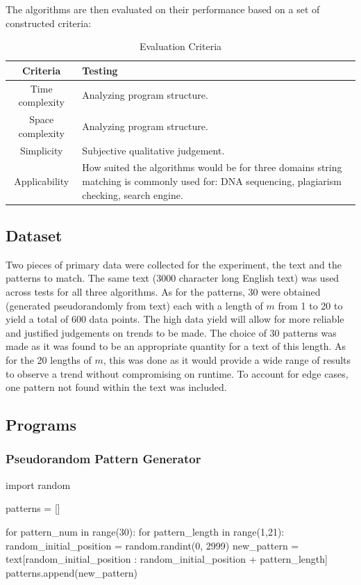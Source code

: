 \documentclass[12pt]{article}
\begin{document}
The algorithms are then evaluated on their performance based on a set of constructed criteria:

\begin{table}[!htbp]
    \centering
    \begin{tabular}{|c|p{12cm}|}
        \hline
        \textbf{Criteria} & \textbf{Testing} \\
        \hline
        Time complexity & Analyzing program structure. \\[0.25cm]
        Space complexity & Analyzing program structure. \\[0.25cm]
        Simplicity & Subjective qualitative judgement. \\[0.25cm]
        Applicability & How suited the algorithms would be for three domains string matching is commonly used for: DNA sequencing, plagiarism checking, search engine. \\
        \hline
    \end{tabular}
    \caption{Evaluation Criteria}
\end{table}
\pagebreak
\subsection{Dataset}
Two pieces of primary data were collected for the experiment, the text and the patterns to match. The same text (3000 character long English text) was used across tests for all three algorithms. As for the patterns, 30 were obtained (generated pseudorandomly from text) each with a length of $m$ from 1 to 20 to yield a total of 600 data points. The high data yield will allow for more reliable and justified judgements on trends to be made. The choice of 30 patterns was made as it was found to be an appropriate quantity for a text of this length. As for the 20 lengths of $m$, this was done as it would provide a wide range of results to observe a trend without compromising on runtime. To account for edge cases, one pattern not found within the text was included.

\subsection{Programs}
\subsubsection{Pseudorandom Pattern Generator}

\begin{singlespace}
\begin{python}
import random

patterns = []

for pattern_num in range(30):
	for pattern_length in range(1,21):
		random_initial_position = random.randint(0, 2999)
		new_pattern = text[random_initial_position : random_initial_position + pattern_length]
		patterns.append(new_pattern)
\end{python}
\end{singlespace}
\end{document}
